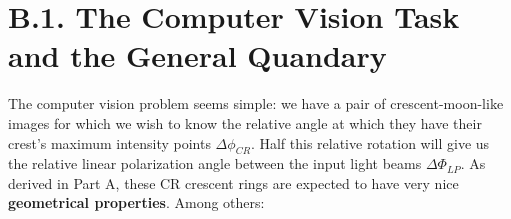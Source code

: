 \documentclass[11pt, a4paper, twoside]{article} %
\begin{document}
\section*{B.1. The Computer Vision Task and the General Quandary}\vspace{-0.3cm}
The computer vision problem seems simple: we have a pair of crescent-moon-like images for which we wish to know the relative angle at which they have their crest's maximum intensity points $\Delta \phi_{CR}$. Half this relative rotation will give us the relative linear polarization angle between the input light beams $\Delta \Phi_{LP}$. As derived in Part A, these CR crescent rings are expected to have very nice {\bf geometrical properties}. Among others:\vspace{-0.3cm}
\end{document}
